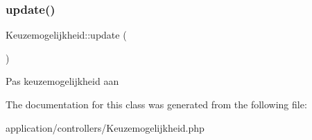 \subsubsection{\texorpdfstring{update()}{update()}}
{\footnotesize\ttfamily Keuzemogelijkheid\+::update (\begin{DoxyParamCaption}{ }\end{DoxyParamCaption})}

Pas keuzemogelijkheid aan 

The documentation for this class was generated from the following file\+:\begin{DoxyCompactItemize}
\item 
application/controllers/Keuzemogelijkheid.\+php\end{DoxyCompactItemize}
